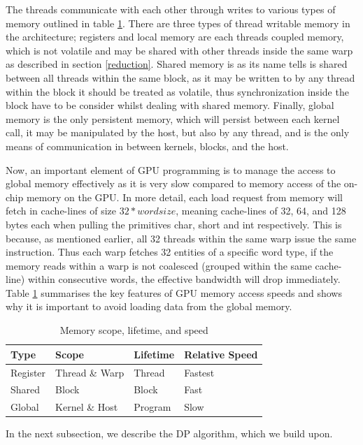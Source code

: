 \documentclass{llncs}
\begin{document}
The threads communicate with each other through writes to various types of memory outlined in table \ref{mem}. There are three types of thread writable memory in the architecture; registers and local memory are each threads coupled memory, which is not volatile and may be shared with other threads inside the same warp as described in section \ref{reduction}.  Shared memory is as its name tells is shared between all threads within the same block, as it may be written to by any thread within the block it should be treated as volatile, thus synchronization inside the block have to be consider whilst dealing with shared memory. Finally, global memory is the only persistent memory, which will persist between each kernel call, it may be manipulated by the host, but also by any thread, and is the only means of communication in between kernels, blocks, and the host.

Now, an important element of GPU programming is to manage the access to global memory effectively as it is very slow compared to memory access of the on-chip memory on the GPU. In more detail, each load request from memory will fetch in cache-lines of size $32*wordsize$, meaning cache-lines of 32, 64, and 128 bytes each when pulling the primitives char, short and int respectively. This is because, as mentioned earlier, all 32 threads within the same warp issue the same instruction.  Thus each warp fetches 32 entities of a specific word type, if the memory reads within a warp is not coalesced (grouped within the same cache-line) within consecutive words, the effective bandwidth will drop immediately. Table \ref{mem} summarises the key features of GPU memory access speeds and shows why it is important to avoid loading data from the global memory.

\begin{table}
\centering
\caption{Memory scope, lifetime, and speed \label{mem}}
\begin{tabular}{|l|l|l|l|} \hline
Type&Scope&Lifetime&Relative Speed \\ \hline
Register&Thread \& Warp&Thread&Fastest\\
Shared&Block&Block&Fast\\
Global&Kernel \& Host&Program&Slow\\
\hline\end{tabular}
\end{table}
In the next subsection, we describe the DP algorithm, which we build upon.
\end{document}

